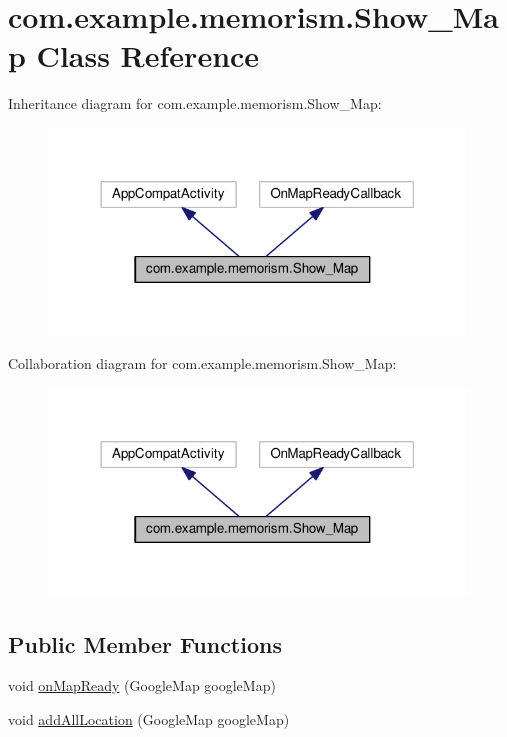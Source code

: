 \hypertarget{classcom_1_1example_1_1memorism_1_1_show___map}{}\section{com.\+example.\+memorism.\+Show\+\_\+\+Map Class Reference}
\label{classcom_1_1example_1_1memorism_1_1_show___map}


Inheritance diagram for com.\+example.\+memorism.\+Show\+\_\+\+Map\+:\nopagebreak
\begin{figure}[H]
\begin{center}
\leavevmode
\includegraphics[width=314pt]{d5/dec/classcom_1_1example_1_1memorism_1_1_show___map__inherit__graph}
\end{center}
\end{figure}


Collaboration diagram for com.\+example.\+memorism.\+Show\+\_\+\+Map\+:\nopagebreak
\begin{figure}[H]
\begin{center}
\leavevmode
\includegraphics[width=314pt]{d3/ddc/classcom_1_1example_1_1memorism_1_1_show___map__coll__graph}
\end{center}
\end{figure}
\subsection*{Public Member Functions}
\begin{DoxyCompactItemize}
\item 
void \hyperlink{classcom_1_1example_1_1memorism_1_1_show___map_a1db450c9105bdeeb9cb57a6253d0cbc4}{on\+Map\+Ready} (Google\+Map google\+Map)
\item 
void \hyperlink{classcom_1_1example_1_1memorism_1_1_show___map_a4c69a84e97fd48c53398ec6057b4b6da}{add\+All\+Location} (Google\+Map google\+Map)
\end{DoxyCompactItemize}
